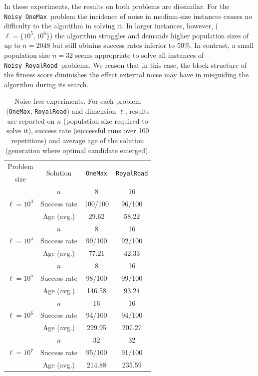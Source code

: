 \documentclass{sig-alternate}
\newcommand{\onemax}{\texttt{OneMax}}
\newcommand{\rroad}{\texttt{RoyalRoad}}
\newcommand{\noisy}{\texttt{Noisy~}}
\begin{document}
In these experiments, the results on both problems are dissimilar. For the \mbox{\noisy\onemax}~problem the incidence of noise in medium-size instances causes no difficulty to the algorithm in solving it. In larger instances, however, ($\ell=\{10^5, 10^6\}$) the algorithm struggles and demands higher population sizes of up to $n=2048$ but still obtains success rates inferior to 50\%. In contrast, a small population size $n=32$ seems appropriate to solve all instances of \noisy \rroad~problems. We reason that in this case, the block-structure of the fitness score diminishes the effect external noise may have in misguiding the algorithm during its search. 

\begin{table}
	\centering
	{\footnotesize
	\renewcommand{\arraystretch}{1.2}
		\begin{tabular}{|c||c||c||c|}
		\hline
		Problem & \multirow{2}{*}{Solution} & \multirow{2}{*}{\onemax} & \multirow{2}{*}{\rroad} \\ 
		size & & & \\
		\hline
		\hline
		\multirow{3}{*}{$\ell=10^3$} 
		 & $n$ & 8 & 16  \\
		 & Success rate & 100/100 & 96/100 \\
		 & Age (avg.)  & 29.62 & 58.22 \\
		\hline
		\hline
		\multirow{3}{*}{$\ell=10^4$} 
		 & $n$ & 8 & 16  \\
		 & Success rate & 99/100 &  92/100\\
		 & Age (avg.)  & 77.21 & 42.33 \\
		\hline
		\hline
		\multirow{3}{*}{$\ell=10^5$} 
		 & $n$ & 8 & 16 \\
		 & Success rate & 98/100 & 99/100 \\
		 & Age (avg.)  & 146.58 &  93.24 \\
		\hline
		\hline
		\multirow{3}{*}{$\ell=10^6$} 
		 & $n$ & 16 & 16  \\
		 & Success rate & 94/100 & 94/100 \\
		 & Age (avg.)  & 229.95 &  207.27 \\
		\hline
		\hline
		\multirow{3}{*}{$\ell=10^7$} 
		 & $n$ & 32 & 32  \\
		 & Success rate & 95/100 &  91/100 \\
		 & Age (avg.)  & 214.88 &  235.59 \\
		\hline
		\end{tabular}
	}
	\caption{Noise-free experiments. For each problem (\onemax, \rroad) and dimension $\ell$, results are reported on $n$ (population size required to solve it), success rate (successful runs over 100 repetitions) and average age of the solution (generation where optimal candidate emerged).} 
	\label{tab:results-noiseless}		
\end{table}
\end{document}
